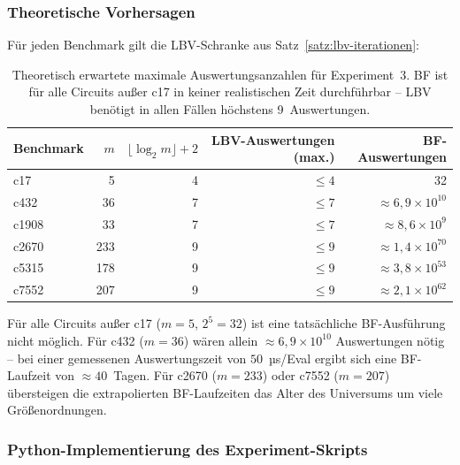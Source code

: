 ﻿\documentclass[a4paper,12pt]{article}
\theoremstyle{definition}
\begin{document}
\subsubsection{Theoretische Vorhersagen}

Für jeden Benchmark gilt die LBV-Schranke aus
Satz~\ref{satz:lbv-iterationen}:

\begin{table}[h]
  \centering
  \begin{tabular}{lrrrr}
    \toprule
    \textbf{Benchmark} & $m$ & $\lfloor\log_2 m\rfloor+2$
      & \textbf{LBV-Auswertungen (max.)} & \textbf{BF-Auswertungen} \\
    \midrule
    c17   &   5 & 4 & $\leq 4$ &                        32 \\
    c432  &  36 & 7 & $\leq 7$ & ${\approx}6{,}9 \times 10^{10}$ \\
    c1908 &  33 & 7 & $\leq 7$ & ${\approx}8{,}6 \times 10^{9}$ \\
    c2670 & 233 & 9 & $\leq 9$ & ${\approx}1{,}4 \times 10^{70}$ \\
    c5315 & 178 & 9 & $\leq 9$ & ${\approx}3{,}8 \times 10^{53}$ \\
    c7552 & 207 & 9 & $\leq 9$ & ${\approx}2{,}1 \times 10^{62}$ \\
    \bottomrule
  \end{tabular}
  \caption{Theoretisch erwartete maximale Auswertungsanzahlen für Experiment~3.
           BF ist für alle Circuits außer c17 in keiner realistischen Zeit
           durchführbar -- LBV benötigt in allen Fällen höchstens 9~Auswertungen.}
  \label{tab:exp3-theorie}
\end{table}

Für alle Circuits außer c17 ($m=5$, $2^5 = 32$) ist eine tatsächliche
BF-Ausführung nicht möglich.  Für c432 ($m=36$) wären allein
${\approx}6{,}9 \times 10^{10}$ Auswertungen nötig -- bei einer gemessenen
Auswertungszeit von $50$\, µs/Eval ergibt sich eine BF-Laufzeit von
${\approx}40$~Tagen.  Für c2670 ($m=233$) oder c7552 ($m=207$) übersteigen
die extrapolierten BF-Laufzeiten das Alter des Universums um viele
Größenordnungen.

\subsubsection{Python-Implementierung des Experiment-Skripts}
\end{document}
